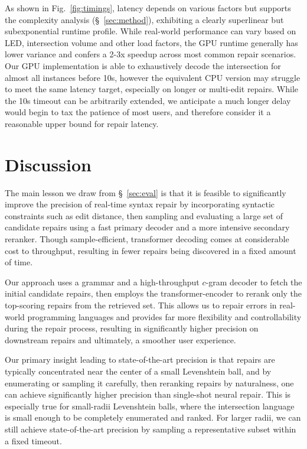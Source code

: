\documentclass[sigplan,acmsmall,nonacm,screen]{acmart}\settopmatter{printfolios=false,printccs=false,printacmref=false}
\begin{document}
\noindent As shown in Fig.~\ref{fig:timings}, latency depends on various factors but supports the complexity analysis (\S~\ref{sec:method}), exhibiting a clearly superlinear but subexponential runtime profile. While real-world performance can vary based on LED, intersection volume and other load factors, the GPU runtime generally has lower variance and confers a 2-3x speedup across most common repair scenarios. Our GPU implementation is able to exhaustively decode the intersection for almost all instances before 10s, however the equivalent CPU version may struggle to meet the same latency target, especially on longer or multi-edit repairs. While the 10s timeout can be arbitrarily extended, we anticipate a much longer delay would begin to tax the patience of most users, and therefore consider it a reasonable upper bound for repair latency.

\clearpage\section{Discussion}\label{sec:discussion}

The main lesson we draw from \S~\ref{sec:eval} is that it is feasible to significantly improve the precision of real-time syntax repair by incorporating syntactic constraints such as edit distance, then sampling and evaluating a large set of candidate repairs using a fast primary decoder and a more intensive secondary reranker. Though sample-efficient, transformer decoding comes at considerable cost to throughput, resulting in fewer repairs being discovered in a fixed amount of time.

Our approach uses a grammar and a high-throughput $c$-gram decoder to fetch the initial candidate repairs, then employs the transformer-encoder to rerank only the top-scoring repairs from the retrieved set. This allows us to repair errors in real-world programming languages and provides far more flexibility and controllability during the repair process, resulting in significantly higher precision on downstream repairs and ultimately, a smoother user experience.

Our primary insight leading to state-of-the-art precision is that repairs are typically concentrated near the center of a small Levenshtein ball, and by enumerating or sampling it carefully, then reranking repairs by naturalness, one can achieve significantly higher precision than single-shot neural repair. This is especially true for small-radii Levenshtein balls, where the intersection language  is small enough to be completely enumerated and ranked. For larger radii, we can still achieve state-of-the-art precision by sampling a representative subset within a fixed timeout.
\end{document}
